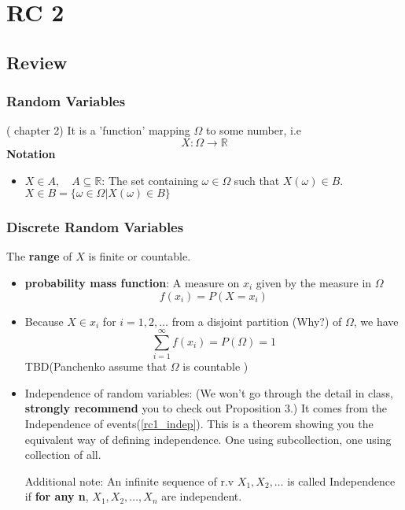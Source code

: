\chapter{RC 2}

\section{Review}
\subsection{Random Variables}
(\cite{Und_Chatterjee} chapter 2) 
It is a 'function' mapping $\Omega$ to some number, i.e
\[
    X : \Omega \to \mathbb{R}
\]
\textbf{Notation}  
\begin{itemize}
    \item \(X \in A,\quad A \subseteq \mathbb{R}\): The set containing  \(\omega \in \Omega \) such that \(X(\omega ) \in B\). \(X \in B  = \{\omega  \in \Omega | X(\omega ) \in B \}\) 
\end{itemize}
\subsection{Discrete Random Variables}
The \textbf{range} of \(X\) is finite or countable. 
\begin{itemize}
    \item \textbf{probability mass function}: A measure on \(x_i\) given by the measure in \(\Omega \)
    \[
        f(x_i) = P(X = x_i)
    \] 
    \item Because \(X \in x_i\) for \(i = 1,2,\dots\) from a disjoint partition (Why?) of \(\Omega \), we have 
    \[
        \sum_{i=1}^{\infty} f(x_i) = P(\Omega ) = 1
    \]
    TBD(Panchenko assume that \(\Omega \) is countable )    
    \item Independence of random variables: 
    (We won't go through the detail in class, \textbf{strongly recommend} you to check out \cite{Und_Chatterjee} Proposition 3.) 
    It comes from the Independence of events(\ref{rc1_indep}). This is a theorem showing you the equivalent way of defining independence. 
    One using subcollection, one using collection of all. 
    
    Additional note: An infinite sequence of r.v \(X_1, X_2 , \dots\) is called Independence if \textbf{for any n}, \(X_1, X_2, \dots, X_n\) are independent.   
\end{itemize}
